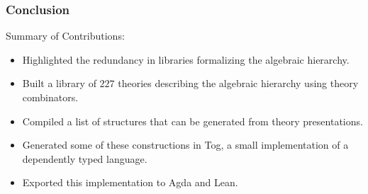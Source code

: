 \documentclass[t,10pt,numbers,fleqn,usenames,xcolor=dvipsnames]{beamer}
\begin{document}
\begin{frame}[fragile] 
\frametitle{Conclusion} 
Summary of Contributions: 
\begin{itemize}
\item Highlighted the redundancy in libraries formalizing the algebraic hierarchy.
\item Built a library of $227$ theories describing the algebraic hierarchy using theory combinators.
\item Compiled a list of structures that can be generated from theory presentations.
\item Generated some of these constructions in Tog, a small implementation of a dependently typed language.
\item Exported this implementation to Agda and Lean.
\end{itemize}
\end{frame}
\end{document}
